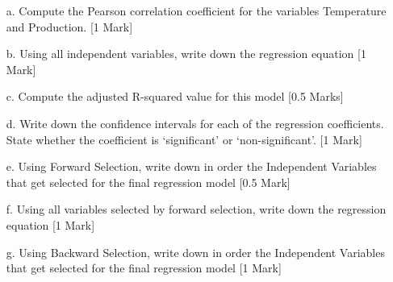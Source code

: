 \documentclass[12pt, a4paper]{article}
\theoremstyle{plain}
\theoremstyle{definition}
\theoremstyle{remark}
\begin{document}
\begin{itemize}
\item[a.] Compute the Pearson correlation coefficient for the variables Temperature and Production. [1 Mark]
\item[b.] Using all independent variables, write down the regression equation [1 Mark]
\item[c.] Compute the adjusted R-squared value for this model [0.5 Marks]
\item[d.] Write down the confidence intervals for each of the regression coefficients. State whether the coefficient is `significant' or `non-significant'. [1 Mark]
\item[e.] Using Forward Selection, write down in order the Independent Variables that get selected for the final regression model [0.5 Mark]
\item[f.] Using all variables selected by forward selection, write down the regression equation [1 Mark] %
\item[g.] Using Backward Selection, write down in order the Independent Variables that get selected for the final regression model [1 Mark] %
\end{itemize}

%
\end{document}
